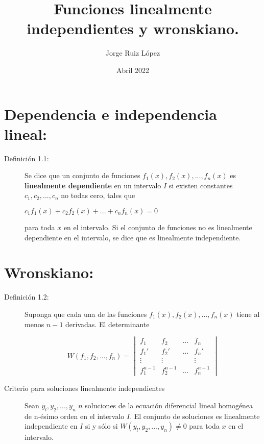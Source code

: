 \documentclass{article}
\title{Funciones linealmente independientes y wronskiano.}
\author{Jorge Ruiz López}
\affil{Facultad de Ingeniería UNAM}
\date{Abril 2022}
\begin{document}
\maketitle
\section{Dependencia e independencia lineal:}
\begin{description}
\item[Definición 1.1:]Se dice que un conjunto de funciones $f_1(x), f_2(x),..., f_n(x)$ es \cite{zill}\textbf{linealmente dependiente} en un intervalo $I$ si existen constantes $c_1, c_2,...,c_n$ no todas cero, tales que
\begin{center}
    $c_1f_1(x)+ c_2f_2(x)+...+c_nf_n(x) = 0$
\end{center}
para toda $x$ en el intervalo. Si el conjunto de funciones no es linealmente dependiente en el intervalo, se dice que es linealmente independiente.
\end{description}
\section{Wronskiano:}
\begin{description}
\item[Definición 1.2:]Suponga que cada una de las funciones $f_1(x), f_2(x), . . . , f_n(x)$ tiene al menos $n-1$ derivadas. El determinante
\begin{center}
\begin{equation}W(f_1, f_2, ...,f_n)= \begin{vmatrix}
f_1 & f_2 & ... & f_n\\
f_1' & f_2' & ... & f_n'\\
\vdots & \vdots & & \vdots\\
f_1^{n-1} & f_2^{n-1} & ... & f_n^{n-1} 
\end{vmatrix}
\end{equation}
\end{center}
\item[Criterio para soluciones linealmente independientes]Sean $y_l, y_2, . . . , y_n$ $n$ soluciones de la ecuación diferencial lineal homogénea de n-ésimo orden en el intervalo $I$. El conjunto de soluciones es linealmente independiente en $I$ si y sólo si $W(y_l, y_2, . . . ,y_n)\neq 0$   para toda $x$ en el intervalo.
\end{description}
\printbibliography
\end{document}
